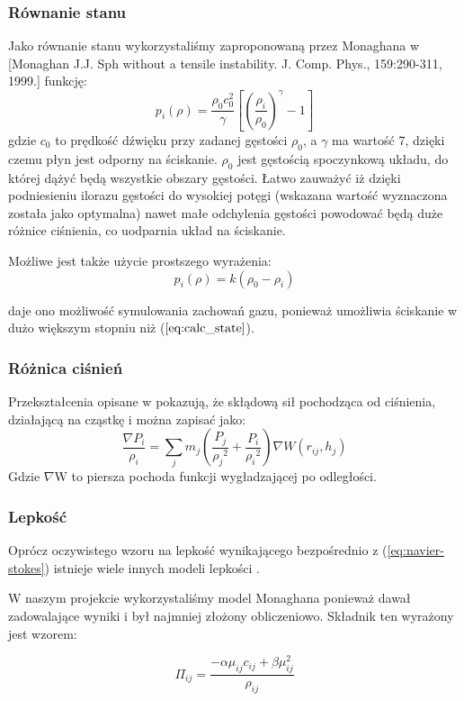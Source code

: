 \documentclass[polish, 12pt]{aghthesis}
\begin{document}
			\subsubsection{Równanie stanu}
			Jako równanie stanu wykorzystaliśmy zaproponowaną przez Monaghana w [Monaghan J.J. Sph without a tensile instability. J. Comp. Phys., 159:290-311, 1999.] funkcję:
			\[p_i(\rho)=\frac{\rho_0 c_0^2}{\gamma}[(\frac{\rho_i}{\rho_0})^{\gamma} - 1] \label{eq:calc_state} \tag{8}\]
			gdzie ${c_0}$ to prędkość dźwięku przy zadanej gęstości ${\rho_0}$, a ${\gamma}$ ma wartość 7, dzięki czemu płyn jest odporny na ściskanie. $\rho_0$ jest gęstością spoczynkową układu, do której dążyć będą wszystkie obszary gęstości. Łatwo zauważyć iż dzięki podniesieniu ilorazu gęstości do wysokiej potęgi (wskazana wartość wyznaczona została jako optymalna) nawet małe odchylenia gęstości powodować będą duże różnice ciśnienia, co uodparnia układ na ściskanie.
			
			Możliwe jest także użycie prostszego wyrażenia:	
			\[p_i(\rho) = k(\rho_0 - \rho_i) \tag{9}\]
			
			daje ono możliwość symulowania zachowań gazu, ponieważ umożliwia ściskanie w dużo większym stopniu niż ($\ref{eq:calc_state}$).
			
			\subsubsection{Różnica ciśnień}
			Przekształcenia opisane w \cite{Boryczko} pokazują, że skłądową sił pochodząca od ciśnienia, działającą na cząstkę i można zapisać jako: \[\frac{\nabla P_i}{\rho_i} = \sum_j m_j(\frac{P_j}{{\rho_j}^2} + \frac{P_i}{{\rho_i}^2})\nabla W(r_{ij}, h_j) \label{eq:calc_pressure} \tag{9}\] Gdzie ${\nabla}$W to piersza pochoda funkcji wygładzającej po odległości.
			
			\subsubsection{Lepkość}
			Oprócz oczywistego wzoru na lepkość wynikającego bezpośrednio z (\ref{eq:navier-stokes}) istnieje wiele innych modeli lepkości \cite{Boryczko}.
						
			W naszym projekcie wykorzystaliśmy model Monaghana ponieważ dawał zadowalające wyniki i był najmniej złożony obliczeniowo. Składnik ten wyrażony jest wzorem:
			
			\[{\Pi}_{ij} = \frac{-\alpha \mu_{ij} c_{ij} + \beta\mu_{ij}^2}{\rho_{ij}} \label{eq:viscosity_term} \tag{10}\]
	
\end{document}
